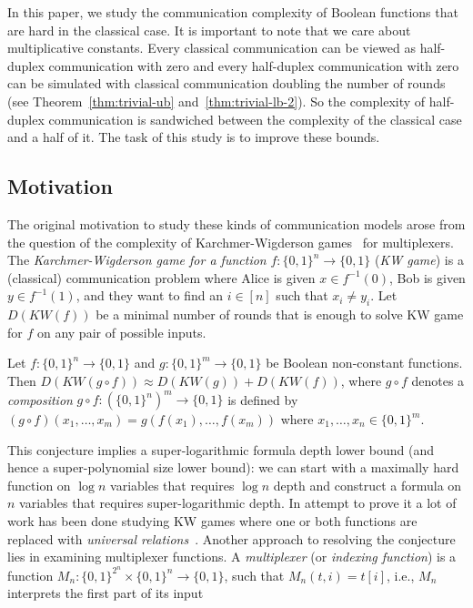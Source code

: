 In this paper, we study the communication complexity of Boolean functions that are hard in the classical case. It is important to note that we care about multiplicative constants. Every classical communication can be viewed as half-duplex communication with zero and every half-duplex communication with zero can be simulated with classical communication doubling the number of rounds (see Theorem~\ref{thm:trivial-ub} and~\ref{thm:trivial-lb-2}). 
So the complexity of half-duplex communication is sandwiched between the complexity of the classical case and a half of it. The task of this study is to improve these bounds.

\subsection{Motivation}
The original motivation to study these kinds of communication models arose from the question of the
complexity of Karchmer-Wigderson games~\cite{KW88} for multiplexers. The \emph{Karchmer-Wigderson game
for a function} $f:\{0,1\}^n\to \{0,1\}$ (\emph{KW game}) is a (classical) communication problem where Alice is given
$x\in f^{-1}(0)$, Bob is given $y\in f^{-1}(1)$, and they want to find an $i\in[n]$ such that $x_i\neq
y_i$. Let $D(KW(f))$ be a minimal number of rounds that is enough to solve KW game for $f$ on any pair of possible inputs.
\begin{conjecture}
Let $f:\{0,1\}^n\to\{0,1\}$ and $g:\{0,1\}^m\to\{0,1\}$ be Boolean non-constant functions.
Then $D(KW(g\circ f))\approx D(KW(g)) + D(KW(f))$, where $g\circ f$ denotes a \emph{composition} $g\circ f : (\{0,1\}^n)^m\to\{0,1\}$ is defined by
\(
    (g\circ f)(x_1,\dotsc,x_m) = g(f(x_1),\dotsc, f(x_m))
\)
where $x_1,\dotsc,x_n\in\{0,1\}^m$.
\end{conjecture}
This conjecture implies a super-logarithmic formula depth lower bound (and hence a super-polynomial size lower bound): we can start with a maximally hard function on $\log n$ variables
that requires $\log n$ depth and construct a formula on $n$ variables that requires
super-logarithmic depth.
In attempt to prove it a lot of work has been done studying KW games where one or both functions are replaced with \emph{universal relations}~\cite{HW90, EIRS01, GMWW17}.
Another approach to resolving the conjecture lies in examining multiplexer functions.
A \emph{multiplexer} (or \emph{indexing function}) is a function $M_n:\{0,1\}^{2^n}\times
\{0,1\}^n\to\{0,1\}$, such that $M_n(t,i) = t[i]$, i.e., $M_n$ interprets the first part of its input
